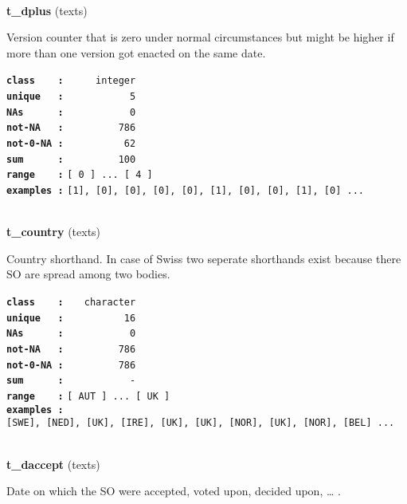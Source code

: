 \documentclass[]{article}
\begin{document}
~

\textbf{t\_dplus} (texts)

Version counter that is zero under normal circumstances but might be
higher if more than one version got enacted on the same date.

\textbf{\texttt{class\ \ \ \ :}} \texttt{~~~~~integer}\\
\textbf{\texttt{unique\ \ \ :}} \texttt{~~~~~~~~~~~5}\\
\textbf{\texttt{NAs\ \ \ \ \ \ :}} \texttt{~~~~~~~~~~~0}\\
\textbf{\texttt{not-NA\ \ \ :}} \texttt{~~~~~~~~~786}\\
\textbf{\texttt{not-0-NA\ :}} \texttt{~~~~~~~~~~62}\\
\textbf{\texttt{sum\ \ \ \ \ \ :}} \texttt{~~~~~~~~~100}\\
\textbf{\texttt{range\ \ \ \ :}}
\texttt{{[}\ 0\ {]}\ ...\ {[}\ 4\ {]}}\\
\textbf{\texttt{examples\ :}}
\texttt{{[}1{]},\ {[}0{]},\ {[}0{]},\ {[}0{]},\ {[}0{]},\ {[}1{]},\ {[}0{]},\ {[}0{]},\ {[}1{]},\ {[}0{]}\ ...}\\

~

\textbf{t\_country} (texts)

Country shorthand. In case of Swiss two seperate shorthands exist
because there SO are spread among two bodies.

\textbf{\texttt{class\ \ \ \ :}} \texttt{~~~character}\\
\textbf{\texttt{unique\ \ \ :}} \texttt{~~~~~~~~~~16}\\
\textbf{\texttt{NAs\ \ \ \ \ \ :}} \texttt{~~~~~~~~~~~0}\\
\textbf{\texttt{not-NA\ \ \ :}} \texttt{~~~~~~~~~786}\\
\textbf{\texttt{not-0-NA\ :}} \texttt{~~~~~~~~~786}\\
\textbf{\texttt{sum\ \ \ \ \ \ :}} \texttt{~~~~~~~~~~~-}\\
\textbf{\texttt{range\ \ \ \ :}}
\texttt{{[}\ AUT\ {]}\ ...\ {[}\ UK\ {]}}\\
\textbf{\texttt{examples\ :}}
\texttt{{[}SWE{]},\ {[}NED{]},\ {[}UK{]},\ {[}IRE{]},\ {[}UK{]},\ {[}UK{]},\ {[}NOR{]},\ {[}UK{]},\ {[}NOR{]},\ {[}BEL{]}\ ...}\\

~

\textbf{t\_daccept} (texts)

Date on which the SO were accepted, voted upon, decided upon, \ldots{} .
\end{document}
